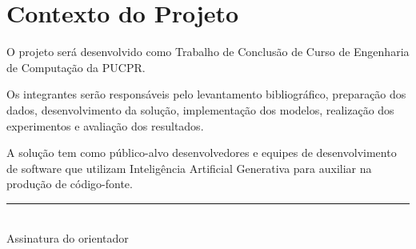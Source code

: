 \documentclass[12pt,a4paper]{article}
\begin{document}
\section{Contexto do Projeto}

O projeto será desenvolvido como Trabalho de Conclusão de Curso de
Engenharia de Computação da PUCPR.

Os integrantes serão responsáveis pelo levantamento bibliográfico,
preparação dos dados, desenvolvimento da solução, implementação dos
modelos, realização dos experimentos e avaliação dos resultados.

A solução tem como público-alvo desenvolvedores e equipes de
desenvolvimento de software que utilizam Inteligência Artificial
Generativa para auxiliar na produção de código-fonte.


\printbibliography[
    heading=bibintoc,
    title={Referências bibliográficas básicas}
]


\vspace{1.5cm}

\begin{center}
    \rule{8cm}{0.4pt}\\
    Assinatura do orientador
\end{center}
\end{document}
